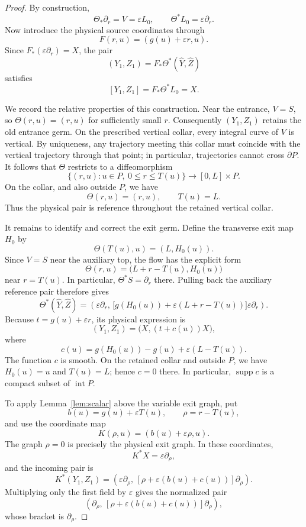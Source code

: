 \documentclass[10pt,a4paper]{amsart}
\begin{document}
\begin{proof}
By construction,
$$
    \Theta_*\partial_r=V=\varepsilon L_0,
    \qquad
    \Theta^*L_0=\varepsilon\partial_r.
$$
Now introduce the physical source coordinates through
$$
    F(r,u)=(g(u)+\varepsilon r,u).
$$
Since $F_*(\varepsilon\partial_r)=X$, the pair
$$
    (Y_1,Z_1)=F_*\Theta^*(\widehat Y,\widehat Z)
$$
satisfies
$$
    [Y_1,Z_1]
    =
    F_*\Theta^*L_0
    =
    X.
$$

We record the relative properties of this construction. Near the entrance, $V=S$, so $\Theta(r,u)=(r,u)$ for sufficiently small $r$. Consequently $(Y_1,Z_1)$ retains the old entrance germ. On the prescribed vertical collar, every integral curve of $V$ is vertical. By uniqueness, any trajectory meeting this collar must coincide with the vertical trajectory through that point; in particular, trajectories cannot cross $\partial P$. It follows that $\Theta$ restricts to a diffeomorphism
$$
    \{(r,u):u\in P,\ 0\le r\le T(u)\}
    \longrightarrow
    [0,L]\times P.
$$
On the collar, and also outside $P$, we have
$$
    \Theta(r,u)=(r,u),
    \qquad
    T(u)=L.
$$
Thus the physical pair is reference throughout the retained vertical collar.

It remains to identify and correct the exit germ. Define the transverse exit map $H_0$ by
$$
    \Theta(T(u),u)=(L,H_0(u)).
$$
Since $V=S$ near the auxiliary top, the flow has the explicit form
$$
    \Theta(r,u)=\bigl(L+r-T(u),H_0(u)\bigr)
$$
near $r=T(u)$. In particular, $\Theta^*S=\partial_r$ there.
Pulling back the auxiliary reference pair therefore gives
$$
    \Theta^*(\widehat Y,\widehat Z)
    =
    \left(
        \varepsilon\partial_r,\,
        \bigl[g(H_0(u))+\varepsilon(L+r-T(u))\bigr]
        \varepsilon\partial_r
    \right).
$$
Because $t=g(u)+\varepsilon r$, its physical expression is
$$
    (Y_1,Z_1)=\bigl(X,(t+c(u))X\bigr),
$$
where
\begin{equation}\label{eq:defect}\tag{4.3}
    c(u)=g(H_0(u))-g(u)+\varepsilon(L-T(u)).
\end{equation}
The function $c$ is smooth. On the retained collar and outside $P$, we have $H_0(u)=u$ and $T(u)=L$; hence $c=0$ there. In particular, $\operatorname{supp}c$ is a compact subset of $\operatorname{int}P$.

To apply Lemma~\ref{lem:scalar} above the variable exit graph, put
$$
    b(u)=g(u)+\varepsilon T(u),
    \qquad
    \rho=r-T(u),
$$
and use the coordinate map
$$
    K(\rho,u)=(b(u)+\varepsilon\rho,u).
$$
The graph $\rho=0$ is precisely the physical exit graph. In these coordinates,
$$
    K^*X=\varepsilon\partial_\rho,
$$
and the incoming pair is
$$
    K^*(Y_1,Z_1)
    =
    \left(
        \varepsilon\partial_\rho,\,
        [\rho+\varepsilon(b(u)+c(u))]\partial_\rho
    \right).
$$
Multiplying only the first field by $\varepsilon$ gives the normalized
pair
$$
    \left(
        \partial_\rho,\,
        [\rho+\varepsilon(b(u)+c(u))]\partial_\rho
    \right),
$$
whose bracket is $\partial_\rho$.


\end{proof}
\end{document}
